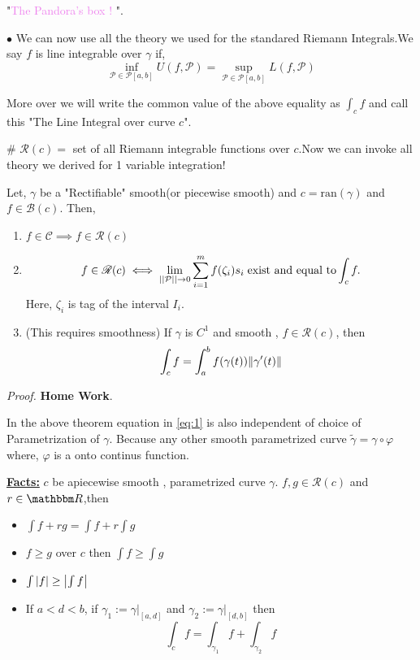 \documentclass[Analysis-3]{subfiles}
\begin{document}
"\textcolor{violet}{The Pandora's box !} ".
\vspace{0.3cm}

$\bullet$ We can now use all the theory we used for the standared Riemann Integrals.We say $f$ is line integrable over $\gamma$ if, 
\[\inf_{\mathcal{P} \in \mathscr{P}[a,b]} U(f,\mathcal{P}) = \sup_{\mathcal{P} \in \mathscr{P}[a,b]} L(f,\mathcal{P})\]

More over we will write the common value of the above equality as $\int_c f$ and call this "The Line Integral over curve $c$".

\# \textbf{$\mathscr{R}(c)=$} set of all Riemann integrable functions over $c$.Now we can invoke all theory we derived for 1 variable integration! 

\begin{Thm}{}{}\label{thm1:23}
Let, $\gamma$ be a "Rectifiable" smooth(or piecewise smooth) and $c = \text{ran}(\gamma)$ and $f \in \mathscr{B}(c)$. Then,
\begin{enumerate}
    \item $f \in \mathscr{C} \implies f \in \mathscr{R}(c)$
    \item \[ f \in \mathscr{R}(c) \iff \lim_{||\mathcal{P}||\to 0} \sum_{i=1}^{m} f(\zeta_i)s_i \hspace{0.1cm} \text{exist and equal to}\int_c f.\] Here, $\zeta_i$ is tag of the interval $I_i$.
    
    \item (This requires smoothness) If $\gamma$ is $C^1$ and smooth , $f \in \mathscr{R}(c)$, then 
    \[\int_c f = \int_a^b f(\gamma(t))\norm{\gamma'(t)} \label{eq:1}\]
   
\end{enumerate}
\end{Thm}

\textit{Proof.} \textbf{Home Work}.

\vspace{0.2cm}

In the above theorem equation in \ref{eq:1} is also independent of choice of Parametrization of $\gamma$. Because any other smooth parametrized curve $\tilde{\gamma} = \gamma \circ \varphi$ where, $\varphi$ is a onto continus function.

\vspace{1cm} 

\textbf{\underline{Facts:}} $c$ be apiecewise smooth , parametrized curve $\gamma$. $f,g \in \mathscr{R}(c)$ and $r \in \R$,then
\begin{itemize}
    \item $\int f+rg = \int f + r\int g $
    \item $f \ge g$ over $c$ then $\int f \ge \int g$
    \item $\int \abs{f} \ge \abs{\int f}$
    \item If $a<d<b$, if $\gamma_1 := \gamma |_{[a,d]}$ and $\gamma_2 := \gamma |_{[d,b]}$ then 
     \[\int_c f = \int_{\gamma_1}f + \int_{\gamma_2} f \]
\end{itemize}
\end{document}
